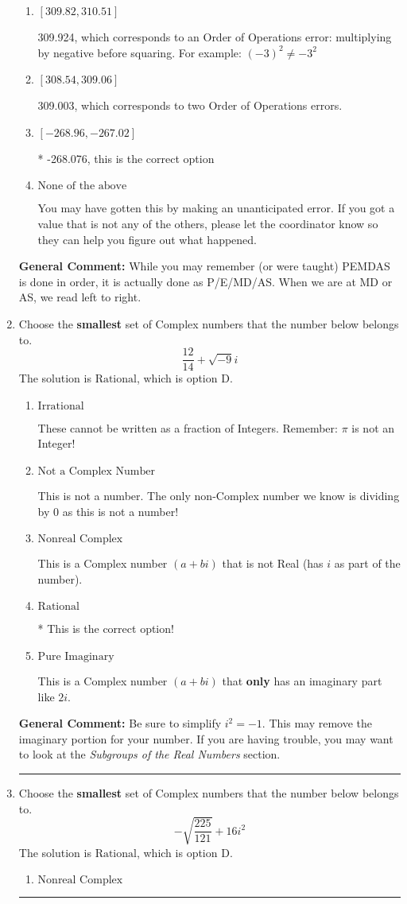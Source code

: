 \documentclass{extbook}[14pt]
\newcommand{\litem}[1]{\item #1

\rule{\textwidth}{0.4pt}}
\begin{document}
\begin{enumerate}
{\begin{enumerate}[label=\Alph*.]
 -268.997, which corresponds to an Order of Operations error: not reading left-to-right for multiplication/division.
\item \( [309.82, 310.51] \)

 309.924, which corresponds to an Order of Operations error: multiplying by negative before squaring. For example: $(-3)^2 \neq -3^2$
\item \( [308.54, 309.06] \)

 309.003, which corresponds to two Order of Operations errors.
\item \( [-268.96, -267.02] \)

* -268.076, this is the correct option
\item \( \text{None of the above} \)

 You may have gotten this by making an unanticipated error. If you got a value that is not any of the others, please let the coordinator know so they can help you figure out what happened.
\end{enumerate}

\textbf{General Comment:} While you may remember (or were taught) PEMDAS is done in order, it is actually done as P/E/MD/AS. When we are at MD or AS, we read left to right.
}
\litem{
Choose the \textbf{smallest} set of Complex numbers that the number below belongs to.
\[ \frac{12}{14}+\sqrt{-9}i \]The solution is \( \text{Rational} \), which is option D.\begin{enumerate}[label=\Alph*.]
\item \( \text{Irrational} \)

These cannot be written as a fraction of Integers. Remember: $\pi$ is not an Integer!
\item \( \text{Not a Complex Number} \)

This is not a number. The only non-Complex number we know is dividing by 0 as this is not a number!
\item \( \text{Nonreal Complex} \)

This is a Complex number $(a+bi)$ that is not Real (has $i$ as part of the number).
\item \( \text{Rational} \)

* This is the correct option!
\item \( \text{Pure Imaginary} \)

This is a Complex number $(a+bi)$ that \textbf{only} has an imaginary part like $2i$.
\end{enumerate}

\textbf{General Comment:} Be sure to simplify $i^2 = -1$. This may remove the imaginary portion for your number. If you are having trouble, you may want to look at the \textit{Subgroups of the Real Numbers} section.
}
\litem{
Choose the \textbf{smallest} set of Complex numbers that the number below belongs to.
\[ -\sqrt{\frac{225}{121}} + 16i^2 \]The solution is \( \text{Rational} \), which is option D.\begin{enumerate}[label=\Alph*.]
\item \( \text{Nonreal Complex} \)


\end{enumerate}}
\end{enumerate}
\end{document}
